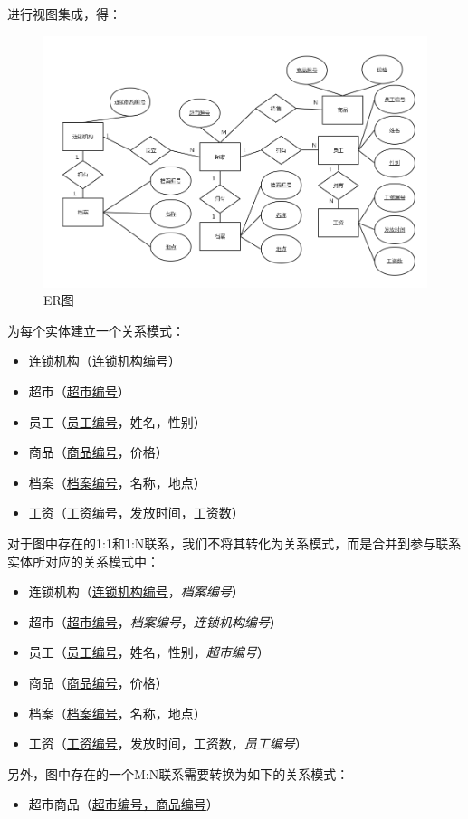 \newpage
进行视图集成，得：
\begin{figure}[H]
	\centering
	\includegraphics[width=\textwidth]{all1}
	\caption{ER图}
	\label{fig:4}
\end{figure}
为每个实体建立一个关系模式：
\begin{itemize}
	\item 连锁机构（\underline{连锁机构编号}）
	\item 超市（\underline{超市编号}）
	\item 员工（\underline{员工编号}，姓名，性别）
	\item 商品（\underline{商品编号}，价格）
	\item 档案（\underline{档案编号}，名称，地点）
	\item 工资（\underline{工资编号}，发放时间，工资数）
\end{itemize}
对于图中存在的1:1和1:N联系，我们不将其转化为关系模式，而是合并到参与联系实体所对应的关系模式中：
\begin{itemize}
	\item 连锁机构（\underline{连锁机构编号}，\textit{档案编号}）
	\item 超市（\underline{超市编号}，\textit{档案编号}，\textit{连锁机构编号}）
	\item 员工（\underline{员工编号}，姓名，性别，\textit{超市编号}）
	\item 商品（\underline{商品编号}，价格）
	\item 档案（\underline{档案编号}，名称，地点）
	\item 工资（\underline{工资编号}，发放时间，工资数，\textit{员工编号}）
\end{itemize}
另外，图中存在的一个M:N联系需要转换为如下的关系模式：
\begin{itemize}
	\item 超市商品（\underline{超市编号，商品编号}）
\end{itemize}
